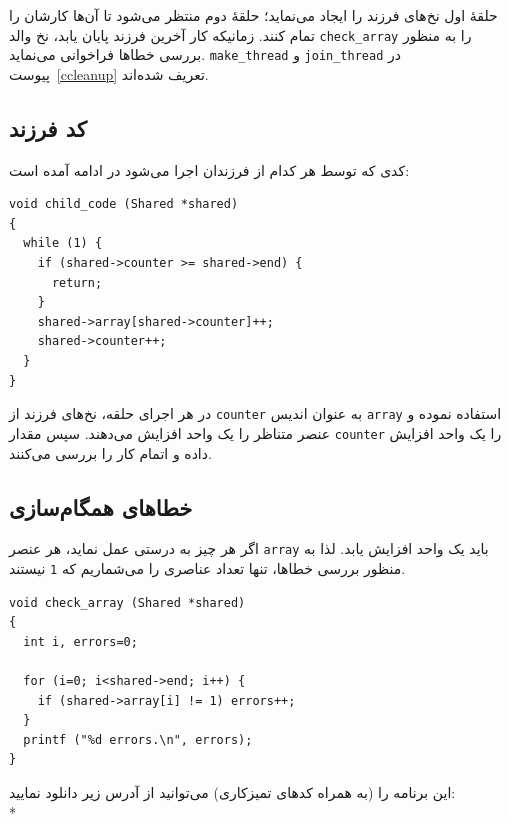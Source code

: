 \documentclass{book}
\begin{document}
    حلقهٔ اول نخ‌های فرزند را ایجاد می‌نماید؛ حلقهٔ دوم منتظر می‌شود تا آن‌ها کارشان را تمام کنند. زمانیکه کار آخرین فرزند پایان یابد،‌
    نخ والد {\tt check\_array} را به منظور بررسی خطاها فراخوانی می‌نماید. {\tt make\_thread} و {\tt join\_thread}
    در پیوست~\ref{ccleanup} تعریف شده‌اند. 

\subsection{کد فرزند}

    کدی که توسط هر کدام از فرزندان اجرا می‌شود در ادامه آمده است: 

\begin{latin}
\begin{lstlisting}
void child_code (Shared *shared)
{
  while (1) {
    if (shared->counter >= shared->end) {
      return;
    }
    shared->array[shared->counter]++;
    shared->counter++;
  }
}
\end{lstlisting}
\end{latin}

    در هر اجرای حلقه، نخ‌های فرزند از {\tt counter} به عنوان اندیس {\tt array} استفاده نموده و عنصر متناظر را یک واحد افزایش می‌دهند. 
    سپس مقدار  {\tt counter}  را یک واحد افزایش داده و اتمام کار را بررسی می‌کنند. 
    

\subsection{خطاهای همگام‌سازی}

    اگر هر چیز به درستی عمل نماید، هر عنصر {\tt array} باید یک واحد افزایش یابد. 
    لذا به منظور بررسی خطاها، تنها تعداد عناصری را می‌شماریم که {\tt 1} نیستند.

\begin{latin}
\begin{lstlisting}
void check_array (Shared *shared)
{
  int i, errors=0;

  for (i=0; i<shared->end; i++) {
    if (shared->array[i] != 1) errors++;
  }
  printf ("%d errors.\n", errors);
}
\end{lstlisting}
\end{latin}

    این برنامه را (به همراه کدهای تمیزکاری) می‌توانید از آدرس زیر دانلود نمایید: \\*    
\end{document}
